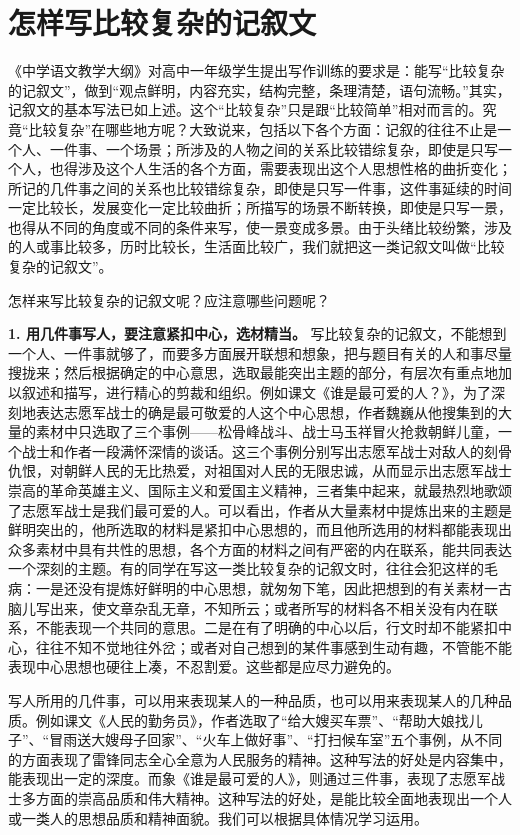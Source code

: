 
\section{怎样写比较复杂的记叙文}

《中学语文教学大纲》对高中一年级学生提出写作训练的要求是：能写“比较复杂的记叙文”，做到“观点鲜明，内容充实，结构完整，条理清楚，语句流畅。”其实，记叙文的基本写法已如上述。这个“比较复杂”只是跟“比较简单”相对而言的。究竟“比较复杂”在哪些地方呢？大致说来，包括以下各个方面：记叙的往往不止是一个人、一件事、一个场景；所涉及的人物之间的关系比较错综复杂，即使是只写一个人，也得涉及这个人生活的各个方面，需要表现出这个人思想性格的曲折变化；所记的几件事之间的关系也比较错综复杂，即使是只写一件事，这件事延续的时间一定比较长，发展变化一定比较曲折；所描写的场景不断转换，即使是只写一景，也得从不同的角度或不同的条件来写，使一景变成多景。由于头绪比较纷繁，涉及的人或事比较多，历时比较长，生活面比较广，我们就把这一类记叙文叫做“比较复杂的记叙文”。

怎样来写比较复杂的记叙文呢？应注意哪些问题呢？

\textbf{1. 用几件事写人，要注意紧扣中心，选材精当。}
写比较复杂的记叙文，不能想到一个人、一件事就够了，而要多方面展开联想和想象，把与题目有关的人和事尽量搜拢来；然后根据确定的中心意思，选取最能突出主题的部分，有层次有重点地加以叙述和描写，进行精心的剪裁和组织。例如课文《谁是最可爱的人？》，为了深刻地表达志愿军战士的确是最可敬爱的人这个中心思想，作者魏巍从他搜集到的大量的素材中只选取了三个事例——松骨峰战斗、战士马玉祥冒火抢救朝鲜儿童，一个战士和作者一段满怀深情的谈话。这三个事例分别写出志愿军战士对敌人的刻骨仇恨，对朝鲜人民的无比热爱，对祖国对人民的无限忠诚，从而显示出志愿军战士崇高的革命英雄主义、国际主义和爱国主义精神，三者集中起来，就最热烈地歌颂了志愿军战士是我们最可爱的人。可以看出，作者从大量素材中提炼出来的主题是鲜明突出的，他所选取的材料是紧扣中心思想的，而且他所选用的材料都能表现出众多素材中具有共性的思想，各个方面的材料之间有严密的内在联系，能共同表达一个深刻的主题。有的同学在写这一类比较复杂的记叙文时，往往会犯这样的毛病：一是还没有提炼好鲜明的中心思想，就匆匆下笔，因此把想到的有关素材一古脑儿写出来，使文章杂乱无章，不知所云；或者所写的材料各不相关没有内在联系，不能表现一个共同的意思。二是在有了明确的中心以后，行文时却不能紧扣中心，往往不知不觉地往外岔；或者对自己想到的某件事感到生动有趣，不管能不能表现中心思想也硬往上凑，不忍割爱。这些都是应尽力避免的。

写人所用的几件事，可以用来表现某人的一种品质，也可以用来表现某人的几种品质。例如课文《人民的勤务员》，作者选取了“给大嫂买车票”、“帮助大娘找儿子”、“冒雨送大嫂母子回家”、“火车上做好事”、“打扫候车室”五个事例，从不同的方面表现了雷锋同志全心全意为人民服务的精神。这种写法的好处是内容集中，能表现出一定的深度。而象《谁是最可爱的人》，则通过三件事，表现了志愿军战士多方面的崇高品质和伟大精神。这种写法的好处，是能比较全面地表现出一个人或一类人的思想品质和精神面貌。我们可以根据具体情况学习运用。

